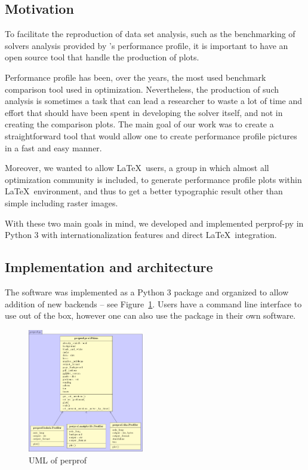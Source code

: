 \subsection*{Motivation}

    To facilitate the reproduction of data set analysis, such as the
    benchmarking of solvers analysis provided by \citeauthor{Dolan:2002du}'s
    performance profile, it is important to have an open source tool that handle
    the production of plots.

    Performance profile has been, over the years, the most used benchmark
    comparison tool used in optimization. Nevertheless, the production of such
    analysis is sometimes a task that can lead a researcher to waste a lot of
    time and effort that should have been spent in developing the solver
    itself, and not in creating the comparison plots. The main goal of our work
    was to create  a straightforward  tool that would allow one to create
    performance profile pictures in a fast and easy manner.

    Moreover,  we wanted to allow \LaTeX\ users, a group in which almost all
    optimization community is included,  to   generate performance profile
    plots within \LaTeX\ environment, and thus to get a better typographic
    result other than simple including raster  images.

    With these two main goals in mind, we developed and implemented perprof-py
    in Python 3 with internationalization features and direct \LaTeX\
    integration.

\subsection*{Implementation and architecture}

    The software was implemented as a Python 3 package
    and organized
    to allow addition of new backends --  see Figure~\ref{fig:uml}.
    Users have a command line interface to use out of the box,
    however one can also use the package in their own software.

    \begin{figure}[!htb]
      \centering
      \includegraphics[width=0.45\textwidth]{uml/uml.pdf}
      \caption{UML of perprof}
      \label{fig:uml}
    \end{figure}

